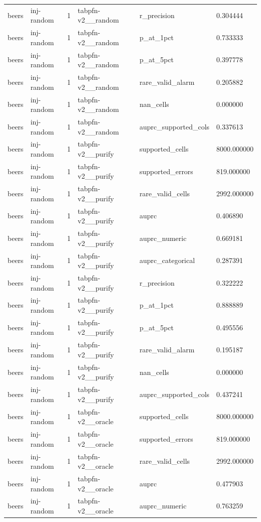 \begin{tabular}{llllll}
beers & inj-random & 1 & tabpfn-v2\_\_random & r\_precision & 0.304444 \\
beers & inj-random & 1 & tabpfn-v2\_\_random & p\_at\_1pct & 0.733333 \\
beers & inj-random & 1 & tabpfn-v2\_\_random & p\_at\_5pct & 0.397778 \\
beers & inj-random & 1 & tabpfn-v2\_\_random & rare\_valid\_alarm & 0.205882 \\
beers & inj-random & 1 & tabpfn-v2\_\_random & nan\_cells & 0.000000 \\
beers & inj-random & 1 & tabpfn-v2\_\_random & auprc\_supported\_cols & 0.337613 \\
beers & inj-random & 1 & tabpfn-v2\_\_purify & supported\_cells & 8000.000000 \\
beers & inj-random & 1 & tabpfn-v2\_\_purify & supported\_errors & 819.000000 \\
beers & inj-random & 1 & tabpfn-v2\_\_purify & rare\_valid\_cells & 2992.000000 \\
beers & inj-random & 1 & tabpfn-v2\_\_purify & auprc & 0.406890 \\
beers & inj-random & 1 & tabpfn-v2\_\_purify & auprc\_numeric & 0.669181 \\
beers & inj-random & 1 & tabpfn-v2\_\_purify & auprc\_categorical & 0.287391 \\
beers & inj-random & 1 & tabpfn-v2\_\_purify & r\_precision & 0.322222 \\
beers & inj-random & 1 & tabpfn-v2\_\_purify & p\_at\_1pct & 0.888889 \\
beers & inj-random & 1 & tabpfn-v2\_\_purify & p\_at\_5pct & 0.495556 \\
beers & inj-random & 1 & tabpfn-v2\_\_purify & rare\_valid\_alarm & 0.195187 \\
beers & inj-random & 1 & tabpfn-v2\_\_purify & nan\_cells & 0.000000 \\
beers & inj-random & 1 & tabpfn-v2\_\_purify & auprc\_supported\_cols & 0.437241 \\
beers & inj-random & 1 & tabpfn-v2\_\_oracle & supported\_cells & 8000.000000 \\
beers & inj-random & 1 & tabpfn-v2\_\_oracle & supported\_errors & 819.000000 \\
beers & inj-random & 1 & tabpfn-v2\_\_oracle & rare\_valid\_cells & 2992.000000 \\
beers & inj-random & 1 & tabpfn-v2\_\_oracle & auprc & 0.477903 \\
beers & inj-random & 1 & tabpfn-v2\_\_oracle & auprc\_numeric & 0.763259 \\

\end{tabular}
